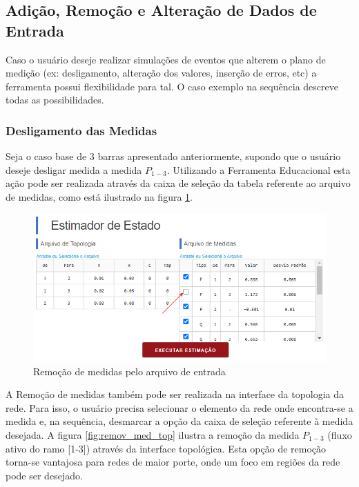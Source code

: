 \documentclass{article}
\begin{document}
\subsection{Adição, Remoção e Alteração de Dados de Entrada}
Caso o usuário deseje realizar simulações de eventos que alterem o plano de medição (ex: desligamento, alteração dos valores, inserção de erros, etc) a ferramenta possui flexibilidade para tal. O caso exemplo na sequência descreve todas as possibilidades.

\subsubsection{Desligamento das Medidas}
Seja o caso base de 3 barras apresentado anteriormente, supondo que o usuário deseje desligar medida a medida $P_{1-3}$. Utilizando a Ferramenta Educacional esta ação pode ser realizada através da caixa de seleção da tabela referente ao arquivo de medidas, como está ilustrado na figura \ref{fig:remov_med}. 


\begin{figure}[H]
    \centering
    \includegraphics[scale=.5]{Imagens/Remoção_de_medidas.PNG}
    \caption{Remoção de medidas pelo arquivo de entrada}
    \label{fig:remov_med}
\end{figure}

A Remoção de medidas também pode ser realizada na interface da topologia da rede. Para isso, o usuário precisa selecionar o elemento da rede onde encontra-se a medida e, na sequência, desmarcar a opção da caixa de seleção referente à medida desejada. A figura \ref{fig:remov_med_top} ilustra a remoção da medida $P_{1-3}$ (fluxo ativo do ramo [1-3]) através da interface topológica.
Esta opção de remoção torna-se vantajosa para redes de maior porte, onde um foco em regiões da rede pode ser desejado.
\end{document}
